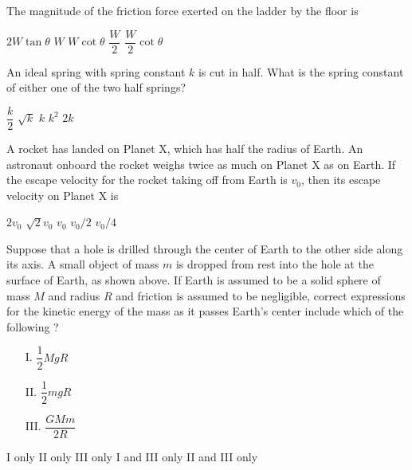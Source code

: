 \documentclass[12pt]{../../oss-classkick-exam}
\begin{document}
\begin{questions}
  \question The magnitude of the friction force exerted on the ladder by the
  floor is  
  \begin{choices}
    \choice $2W\tan\theta$
    \choice $W$
    \choice $W\cot\theta$
    \choice $\dfrac W2$
    \choice $\dfrac W2\cot\theta$
  \end{choices}
  \label{ladder2}
  
  \question An ideal spring with spring constant $k$ is cut in half. What is the
  spring constant of either one of the two half springs?
  \begin{choices}
    \choice $\dfrac k2$
    \choice $\sqrt k$
    \choice $k$
    \choice $k^2$
    \choice $2k$
  \end{choices}
  
  \question A rocket has landed on Planet X, which has half the radius of
  Earth. An astronaut onboard the rocket weighs twice as much on Planet X as on
  Earth. If the escape velocity for the rocket taking off from Earth is $v_0$,
  then its escape velocity on Planet X is
  \begin{choices}
    \choice $2v_0$
    \choice $\sqrt2 v_0$
    \choice $v_0$
    \choice $v_0/2$
    \choice $v_0/4$
  \end{choices}
  
  \begin{center}
  \end{center}
  
  \question Suppose that a hole is drilled through the center of Earth to the
  other side along its axis. A small object of mass $m$ is dropped from rest
  into the hole at the surface of Earth, as shown above. If Earth is assumed to
  be a solid sphere of mass $M$ and radius $R$ and friction is assumed to be
  negligible, correct expressions for the kinetic energy of the mass as it
  passes Earth's center include which of the following ?
  \begin{enumerate}[nosep]
  \item[I.] $\dfrac12MgR$
  \item[II.] $\dfrac12mgR$
  \item[III.] $\dfrac{GMm}{2R}$
  \end{enumerate}  
  \begin{choices}
    \choice I only
    \choice II only
    \choice III only
    \choice I and III only
    \choice II and III only
  \end{choices}
\end{questions}
\end{document}
